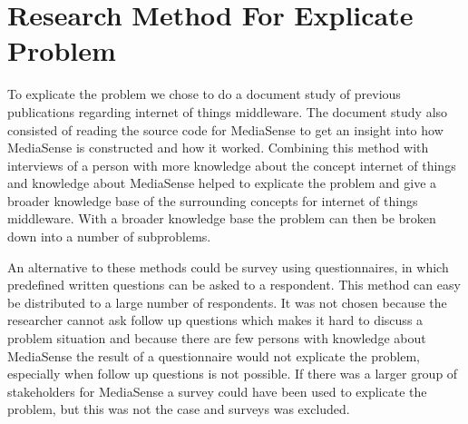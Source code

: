\section{Research Method For Explicate Problem}
To explicate the problem we chose to do a document study of previous publications regarding internet of things middleware. The document study also consisted of reading the source code for MediaSense to get an insight into how MediaSense is constructed and how it worked. Combining this method with interviews of a person with more knowledge about the concept internet of things and knowledge about MediaSense helped to explicate the problem and give a broader knowledge base of the surrounding concepts for internet of things middleware. With a broader knowledge base the problem can then be broken down into a number of subproblems. 

An alternative to these methods could be survey using questionnaires, in which predefined written questions can be asked to a respondent. This method can easy be distributed to a large number of respondents. It was not chosen because the researcher cannot ask follow up questions which makes it hard to discuss a problem situation and because there are few persons with knowledge about MediaSense the result of a questionnaire would not explicate the problem, especially when follow up questions is not possible. If there was a larger group of stakeholders for MediaSense a survey could have been used to explicate the problem, but this was not the case and surveys was excluded.


